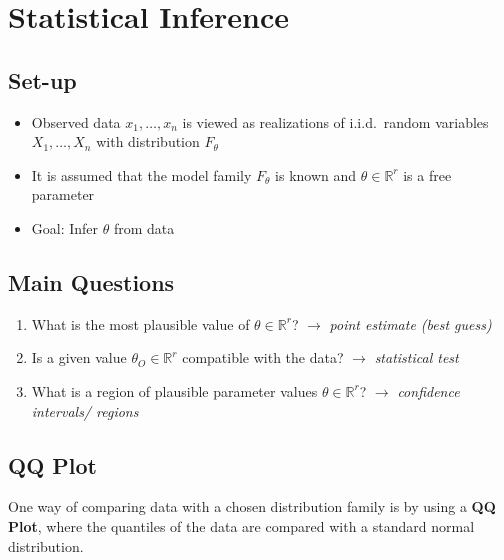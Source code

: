 \section{Statistical Inference}
\subsection{Set-up}
\begin{itemize}
    \item Observed data $x_1,\ldots, x_n$ is viewed as realizations of i.i.d.\ random variables $X_1,\ldots, X_n$ with distribution $F_\theta$
    \item It is assumed that the model family $F_\theta$ is known and $\theta\in \mathbb{R}^r$ is a free parameter
    \item Goal: Infer $\theta$ from data
\end{itemize}

\subsection{Main Questions}
\begin{enumerate}
    \item What is the most plausible value of  $\theta\in \mathbb{R}^r$?\newline
          $\to$ \textit{point estimate (best guess)}
    \item Is a given value  $\theta_O\in \mathbb{R}^r$ compatible with the data?\newline
          $\to$ \textit{statistical test}
    \item What is a region of plausible parameter values  $\theta\in \mathbb{R}^r$?\newline
          $\to$ \textit{confidence intervals/ regions}
\end{enumerate}

\subsection{QQ Plot}
One way of comparing data with a chosen distribution family is by using a \textbf{QQ Plot},
where the quantiles of the data are compared with a standard normal distribution.


